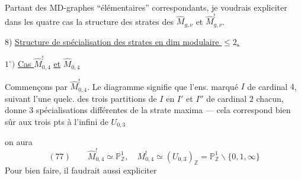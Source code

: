Partant des MD-graphes ``élémentaires'' correspondants, je voudrais expliciter dans les quatre cas la structure  des strates des $\widehat M_{g,\nu}$ et $\widehat M^!_{g,\nu}$.

8) \uline{Structure de spécialisation des strates en dim modulaire $\leq2$.}

$1^\circ)$ \uline{Cas } $\widehat M^!_{0,4}$ \uline{et} $\widehat M_{0,4}$

Commençons par $\widehat M^!_{0,4}$.
Le diagramme signifie que l'ens. marqué $I$ de cardinal $4$,  suivant l'une quelc. des trois partitions de $I$ en $I'$ et $I''$ de cardinal $2$ chacun, donne $3$ spécialisations différentes de la strate maxima --- cela correspond bien sûr aux trois pts à l'infini de $U_{0,3}$

on aura
\[
(77)\qquad \widehat M^!_{0,4}\simeq\mathbb P^1_{\mathbb Z},\quad M^!_{0,4}\simeq(U_{0,3})_{\mathbb Z}=\mathbb P^1_{\mathbb Z}\smallsetminus\{0,1,\infty\}
\]
Pour bien faire, il faudrait aussi expliciter

